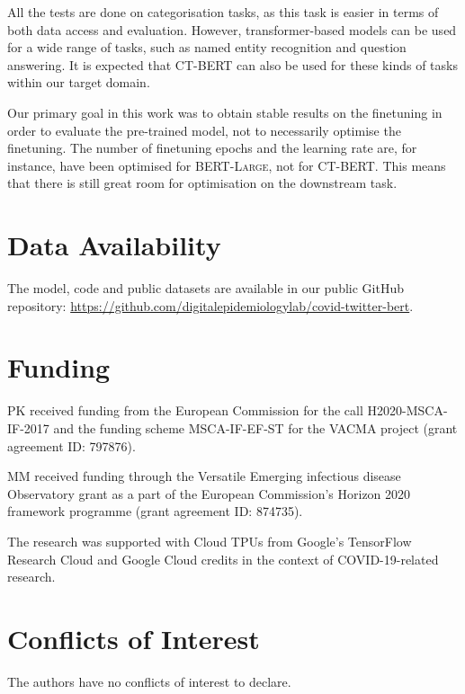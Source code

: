 \documentclass{article}
\begin{document}
All the tests are done on categorisation tasks, as this task is easier in terms of both data access and evaluation.
However, transformer-based models can be used for a wide range of tasks, such as named entity recognition and question answering.
It is expected that \textsc{CT-BERT} can also be used for these kinds of tasks within our target domain.

Our primary goal in this work was to obtain stable results on the finetuning in order to evaluate the pre-trained model, not to necessarily optimise the finetuning.
The number of finetuning epochs and the learning rate are, for instance, have been optimised for \textsc{BERT-Large}, not for \textsc{CT-BERT}.
This means that there is still great room for optimisation on the downstream task.


\section{Data Availability}
The model, code and public datasets are available in our public GitHub repository: \url{https://github.com/digitalepidemiologylab/covid-twitter-bert}.

\section{Funding}
PK received funding from the European Commission for the call H2020-MSCA-IF-2017 and the funding scheme MSCA-IF-EF-ST for the VACMA project (grant agreement ID: 797876).

MM received funding through the Versatile Emerging infectious disease Observatory grant as a part of the European Commission’s Horizon 2020 framework programme (grant agreement ID: 874735).

The research was supported with Cloud TPUs from Google's TensorFlow Research Cloud and Google Cloud credits in the context of COVID-19-related research.

\section{Conflicts of Interest}
The authors have no conflicts of interest to declare.




\end{document}
